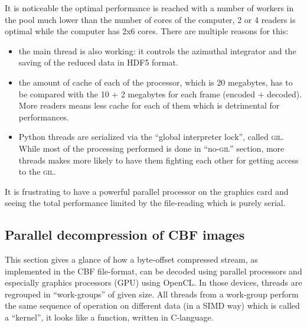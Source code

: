 \documentclass[preprint, pdf]{iucr}              %
\begin{document}
It is noticeable the optimal performance is reached with a number of
workers in the pool much lower than the number of cores of the computer, 2 or 4
readers is optimal while the computer has 2x6 cores.
There are multiple reasons for this:
\begin{itemize}
  \item the main thread is also working: it controls the azimuthal
  integrator and the saving of the reduced data in HDF5 format.
  \item the amount of cache of each of the processor, which is 20 megabytes, has
  to be compared with the 10 + 2 megabytes for each frame (encoded + decoded).
  More readers means less cache for each of them which is detrimental
  for performances.
  \item Python threads are serialized via the ``global interpreter lock'',
  called \textsc{gil}.
  While most of the processing performed is done in ``no-\textsc{gil}'' section,
  more threads makes more likely to have them fighting each other
  for getting access to the \textsc{gil}.
\end{itemize}

It is frustrating to have a powerful parallel processor on the
graphics card and seeing the total performance limited by the file-reading
which is purely serial.

\subsection{Parallel decompression of CBF images}
 
This section gives a glance of how a byte-offset compressed stream,
as implemented in the CBF file-format, can be decoded using parallel processors
and especially graphics processors (GPU) using OpenCL\cite{opencl}.
In those devices, threads are regrouped in ``work-groups'' of given size. 
All threads from a work-group perform the same sequence of operation on
different data (in a SIMD way) which is called a ``kernel'', it looks like a
function, written in C-language.
\end{document}
